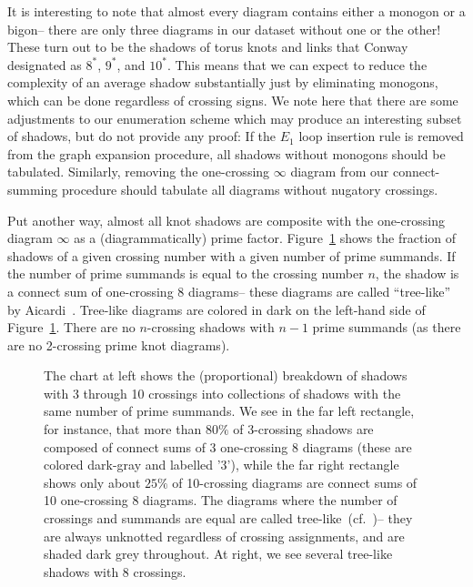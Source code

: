 \documentclass[amsmath,secnumarabic,floatfix,amssymb,nofootinbib,nobibnotes,letterpaper,11pt,tightenlines,showkeys]{revtex4}
\theoremstyle{definition}
\newcommand{\loopinsert}{E_1}
\let\mgp=\marginpar \marginparwidth18mm \marginparsep1mm
\def\marginpar#1{\mgp{\raggedright\tiny #1}}
\let\lbl=\label
\def\label#1{\lbl{#1}\ifinner\else\marginpar{\ref{#1} #1}\ignorespaces\fi}
\begin{document}
It is interesting to note that almost every diagram contains either a monogon or a bigon-- there are only three diagrams in our dataset without one or the other! These turn out to be the shadows of torus knots and links that Conway designated as $8^*$, $9^*$, and $10^*$. This means that we can expect to reduce the complexity of an average shadow substantially just by eliminating monogons, which can be done regardless of crossing signs. We note here that there are some adjustments to our enumeration scheme which may produce an interesting subset of shadows, but do not provide any proof: If the $\loopinsert$ loop insertion rule is removed from the graph expansion procedure, all shadows without monogons should be tabulated. Similarly, removing the one-crossing $\infty$ diagram from our connect-summing procedure should tabulate all diagrams without nugatory crossings.

Put another way, almost all knot shadows are composite with the one-crossing diagram $\infty$ as a (diagrammatically) prime factor. Figure~\ref{fig:proportiongraphic} shows the fraction of shadows of a given crossing number with a given number of prime summands. If the number of prime summands is equal to the crossing number $n$, the shadow is a connect sum of one-crossing $8$ diagrams-- these diagrams are called ``tree-like'' by Aicardi~\cite{Aicardi:1994uq}.
Tree-like diagrams are colored in dark on the left-hand side of Figure~\ref{fig:proportiongraphic}. There are no $n$-crossing shadows with $n-1$ prime summands (as there are no 2-crossing prime knot diagrams). 

\begin{figure}
\hfill
{}
\hfill
{}
\hfill
\hphantom{.}
\caption{The chart at left shows the (proportional) breakdown of shadows with 3 through 10 crossings into collections of shadows with the same number of prime summands. We see in the far left rectangle, for instance, that more than $80\%$ of 3-crossing shadows are composed of connect sums of 3 one-crossing $8$ diagrams (these are colored dark-gray and labelled '3'), while the far right rectangle shows only about $25\%$ of 10-crossing diagrams are connect sums of 10 one-crossing $8$ diagrams. The diagrams where the number of crossings and summands are equal are called tree-like~(cf.~\cite{Aicardi:1994uq})-- they are always unknotted regardless of crossing assignments, and are shaded dark grey throughout. At right, we see several tree-like shadows with 8 crossings.}
\label{fig:proportiongraphic}
\end{figure}
\end{document}
